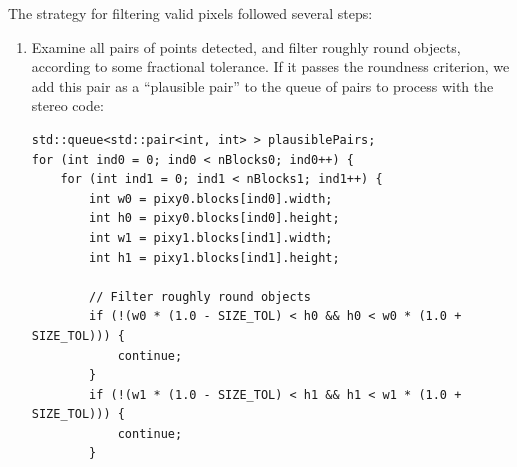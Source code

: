 \documentclass[letterpaper, 11pt]{article}
\begin{document}
The strategy for filtering valid pixels followed several steps:
\begin{enumerate}[label=\textbf{Step \arabic*.}]
    \item Examine all pairs of points detected, and filter roughly round objects, according to some fractional tolerance. If it passes the roundness criterion, we add this pair as a ``plausible pair'' to the queue of pairs to process with the stereo code:
        \begin{verbatim}
std::queue<std::pair<int, int> > plausiblePairs;
for (int ind0 = 0; ind0 < nBlocks0; ind0++) {
    for (int ind1 = 0; ind1 < nBlocks1; ind1++) {
        int w0 = pixy0.blocks[ind0].width;
        int h0 = pixy0.blocks[ind0].height;
        int w1 = pixy1.blocks[ind1].width;
        int h1 = pixy1.blocks[ind1].height;

        // Filter roughly round objects
        if (!(w0 * (1.0 - SIZE_TOL) < h0 && h0 < w0 * (1.0 + SIZE_TOL))) {
            continue;
        }
        if (!(w1 * (1.0 - SIZE_TOL) < h1 && h1 < w1 * (1.0 + SIZE_TOL))) {
            continue;
        }


\end{verbatim}
\end{enumerate}
\end{document}
